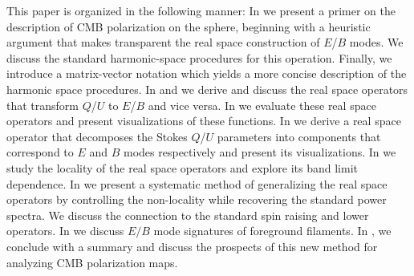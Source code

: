 This paper is organized in the following manner: In  we present a primer on the description of CMB polarization on the sphere, beginning with a heuristic argument that makes transparent the real space construction of $E$/$B$ modes.  We discuss the standard harmonic-space procedures for this operation. Finally, we introduce a matrix-vector notation which yields a more concise description of the harmonic space procedures. In  and  we derive and discuss the real space operators that transform $Q$/$U$ to $E$/$B$ and vice versa. In  we evaluate these real space operators and present visualizations of these functions. In  we derive a real space operator that decomposes the Stokes $Q$/$U$  parameters into components that correspond to $E$ and $B$ modes respectively and present its visualizations.  In  we study the locality of the real space operators and explore its band limit dependence. In  we present a systematic method of generalizing the real space operators by controlling the non-locality while recovering the standard power spectra.  We discuss the connection to the standard spin raising and lower operators. In  we discuss $E/B$ mode signatures of foreground filaments. In , we conclude with a summary and discuss the prospects of this new method for analyzing CMB polarization maps.
